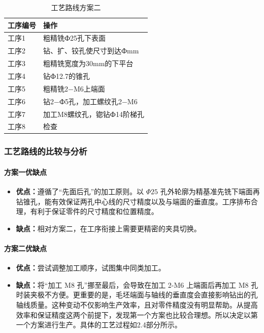 \documentclass[12pt,a4paper,fontset=none]{ctexart}
\begin{document}
    \begin{table}[H]
        \centering
        \caption{工艺路线方案二}
        \begin{tabular}{p{2.2cm} p{9.5cm}}
            \toprule
            工序编号 & 操作               \\
            \midrule
            工序1  & 粗精铣Ф25孔下表面       \\
            工序2  & 钻、扩、铰孔使尺寸到达Фmm   \\
            工序3  & 粗精铣宽度为30mm的下平台   \\
            工序4  & 钻Ф12.7的锥孔        \\
            工序5  & 粗精铣2−M6上端面       \\
            工序6  & 钻2−Ф5孔，加工螺纹孔2−M6 \\
            工序7  & 加工M8螺纹孔，锪钻Ф14阶梯孔 \\
            工序8  & 检查               \\
            \bottomrule
        \end{tabular}\label{tab:table4}
    \end{table}

    \subsubsection{工艺路线的比较与分析}

    \paragraph{方案一优缺点}

    \begin{itemize}
        \item \textbf{优点：}遵循了“先面后孔”的加工原则。以 $\Phi 25$ 孔外轮廓为精基准先铣下端面再钻锥孔，能有效保证两孔中心线的尺寸精度以及与端面的垂直度。工序排布合理，有利于保证零件的尺寸精度和位置精度。
        \item \textbf{缺点：}相对方案二，在工序衔接上需要更精密的夹具切换。
    \end{itemize}

    \paragraph{方案二优缺点}

    \begin{itemize}
        \item \textbf{优点：}尝试调整加工顺序，试图集中同类加工。
        \item \textbf{缺点：}将“加工 M8 孔”挪至最后，会导致在加工 2-M6 上端面后再加工 M8 孔时装夹极不方便。更重要的是，毛坯端面与轴线的垂直度会直接影响钻出的孔轴线质量。这种变动不仅影响生产效率，且对零件精度没有明显帮助。从提高效率和保证精度这两个前提下，发现第一个方案也比较合理想。所以决定以第一个方案进行生产。具体的工艺过程如2.4部分所示。
    \end{itemize}
\end{document}
